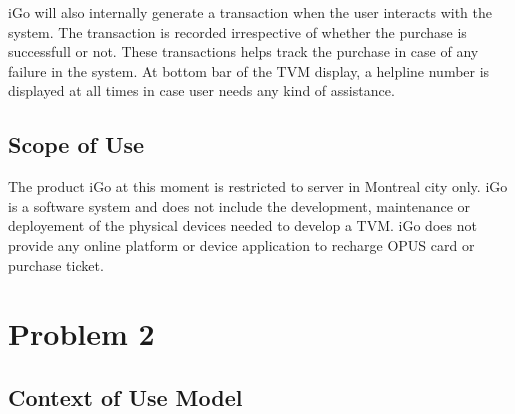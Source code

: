 \documentclass[a4paper,12pt]{report}
\begin{document}
iGo will also internally generate a \gls{transaction} when the user interacts with the system. The transaction is recorded irrespective of whether the purchase is successfull or not. These transactions helps track the purchase in case of any failure in the system. At bottom bar of the TVM display, a helpline number is displayed at all times in case user needs any kind of assistance.

\subsection{Scope of Use}
The product iGo at this moment is restricted to server in Montreal city only. iGo is a software system and does not include the development, maintenance or deployement of the physical devices needed to develop a TVM. iGo does not provide any online platform or device application to recharge OPUS card or purchase ticket.



%
%

\newpage
\section{Problem 2}
\subsection{Context of Use Model}
\end{document}
